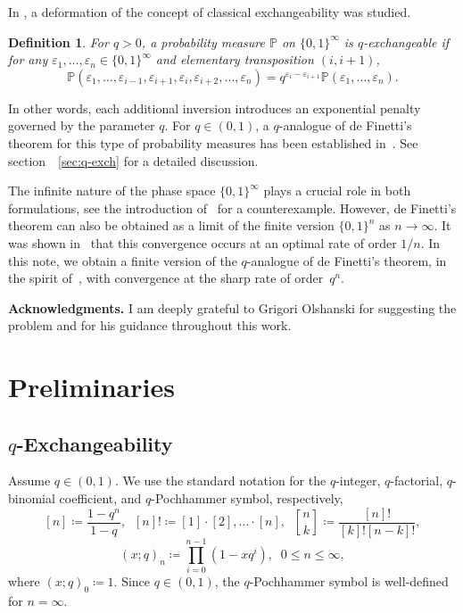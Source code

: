 \documentclass[12pt, a4paper]{amsart}
\numberwithin{equation}{subsection}
\newtheorem{defi}[equation]{Definition}
\theoremstyle{definition}
\newcommand{\qbinom}[3]{\genfrac{[}{]}{0pt}{}{#1}{#2}_{#3}}
\begin{document}
In \cite{gnedin2009qanalogue},  \cite{Gnedin_2010} a deformation of the concept of classical exchangeability was studied.  
\begin{defi}
For $q > 0$, a probability measure $\mathbb{P}$ on $\{0, 1\}^{\infty}$ is $q$-exchangeable if for any $\varepsilon_{1},\ldots,\varepsilon_{n} \in \{0, 1\}^{\infty}$ and elementary transposition $(i,i+1)$,
\begin{equation}\label{def:q_exch}
\mathbb{P}(\varepsilon_{1},\ldots,\varepsilon_{i-1},\varepsilon_{i+1},\varepsilon_{i},\varepsilon_{i+2},\ldots,\varepsilon_{n}) = q^{\varepsilon_{i}-\varepsilon_{i+1}} \mathbb{P}(\varepsilon_{1},\ldots,\varepsilon_{n}).
\end{equation}
\end{defi}
\noindent In other words, each additional inversion introduces an exponential penalty governed by the parameter $q$. For $q \in (0,1)$, a $q$-analogue of de Finetti's theorem for this type of probability measures has been established in~\cite{gnedin2009qanalogue}. See section~~\eqref{sec:q-exch} for a detailed discussion.


The infinite nature of the phase space \( \{0,1\}^\infty \) plays a crucial role in both formulations, see the introduction of~\cite{10.1214/aop/1176994663} for a counterexample. However, de Finetti's theorem can also be obtained as a limit of the finite version \( \{0,1\}^n \) as \( n \to \infty \). It was shown in~\cite{10.1214/aop/1176994663}  that this convergence occurs at an optimal rate of order $1/n$.
In this note, we obtain a finite version of the $q$-analogue of de Finetti's theorem, in the spirit of~\cite{10.1214/aop/1176994663}, with convergence at the sharp rate of order~$q^n$.

\textbf{Acknowledgments.}
I am deeply grateful to Grigori Olshanski for suggesting the problem and for his guidance throughout this work.
\section{Preliminaries}

\subsection{\texorpdfstring{$q$}{q}-Exchangeability} \label{sec:q-exch} Assume $q \in (0, 1)$. We use the standard notation for the $q$-integer, $q$-factorial, $q$-binomial coefficient, and  $q$-Pochhammer symbol, respectively,
\[[n] \coloneqq \frac{1-q^{n}}{1-q}, \;\; [n]! \coloneqq [1]\cdot[2], \ldots\cdot[n], \;\;\qbinom{n}{k}{} \coloneqq \dfrac{[n]!}{[k]![n-k]!}, \] 
\[(x;q)_{n} \coloneqq \prod_{i=0}^{n-1} (1-xq^{i}), \;\; 0\leqslant n \leqslant \infty,\]
where $(x;q)_{0} \coloneqq 1$. Since $q \in (0,1)$, the $q$-Pochhammer symbol is well-defined for $n = \infty$.
\end{document}

